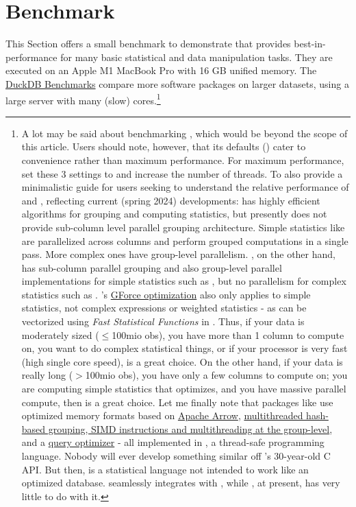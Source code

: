 \documentclass[article]{jss}
\begin{document}
\section{Benchmark} \label{sec:bench}
%
This Section offers a small benchmark to demonstrate that  provides best-in- performance for many basic statistical and data manipulation tasks. They are executed on an Apple M1 MacBook Pro with 16 GB unified memory. The \href{https://duckdblabs.github.io/db-benchmark/}{DuckDB Benchmarks} compare more software packages on larger datasets, using a large server with many (slow) cores.\footnote{A lot may be said about benchmarking , which would be beyond the scope of this article. Users should note, however, that its defaults () cater to convenience rather than maximum performance. For maximum performance, set these 3 settings to  and increase the number of threads. To also provide a minimalistic guide for  users seeking to understand the relative performance of  and , reflecting current (spring 2024) developments:  has highly efficient algorithms for grouping and computing statistics, but presently does not provide sub-column level parallel grouping architecture. Simple statistics like  are parallelized across columns and perform grouped computations in a single pass. More complex ones  have group-level parallelism. , on the other hand, has sub-column parallel grouping and also group-level parallel implementations for simple statistics such as , but no parallelism for complex statistics such as . 's \href{https://rdatatable.gitlab.io/data.table/reference/datatable-optimize.html}{GForce optimization} also only applies to simple statistics, not complex expressions or weighted statistics - as can be vectorized using \emph{Fast Statistical Functions} in . Thus, if your data is moderately sized ($\leq$100mio obs), you have more than 1 column to compute on, you want to do complex statistical things, or if your processor is very fast (high single core speed),  is a great choice. On the other hand, if your data is really long ($>$100mio obs), you have only a few columns to compute on; you are computing simple statistics that  optimizes, and you have massive parallel compute, then  is a great choice. Let me finally note that packages like  use optimized memory formats based on \href{https://arrow.apache.org/}{Apache Arrow}, \href{https://pola.rs/posts/i-wrote-one-of-the-fastest-dataframe-libraries/}{multithreaded hash-based grouping, SIMD instructions and multithreading at the group-level}, and a \href{https://pola.rs/posts/polars_birds_eye_view/}{query optimizer} - all implemented in , a thread-safe programming language. Nobody will ever develop something similar off 's 30-year-old C API. But then,  is a statistical language not intended to work like an optimized database.  seamlessly integrates with , while , at present, has very little to do with it.}
\end{document}
